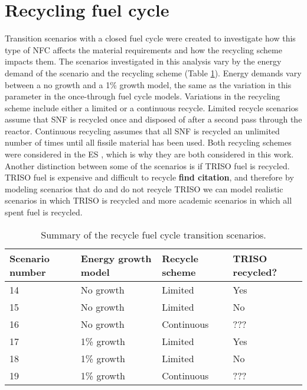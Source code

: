 \section{Recycling fuel cycle}
Transition scenarios with a closed fuel cycle were created
to investigate how this type of \gls{NFC} affects the material requirements 
and how the recycling scheme impacts them. 
The scenarios investigated in this analysis vary by the 
energy demand of the scenario and the recycling scheme (Table 
\ref{tab:scenarios_recycle}). Energy demands vary 
between a no growth and a 1\% growth model, the same as the variation in this 
parameter in the once-through fuel cycle models. Variations in the recycling 
scheme include either a limited or a continuous recycle. Limited recycle 
scenarios assume that \gls{SNF} is recycled once and disposed of after a 
second pass through the reactor. Continuous recycling assumes that all 
\gls{SNF} is recycled an unlimited number of times until all fissile 
material has been used. Both recycling schemes were considered in the 
\acrfull{ES} \cite{wigeland_nuclear_2014}, which is why they are both 
considered in this work. Another distinction between some of the 
scenarios is if \gls{TRISO} fuel is recycled. \gls{TRISO} fuel is 
expensive and difficult to recycle \textbf{find citation}, and 
therefore by modeling scenarios that do and do not recycle 
\gls{TRISO} we can model realistic scenarios in which \gls{TRISO} 
is recycled and more academic scenarios in which all spent fuel is 
recycled. 

\begin{table}[ht]
    \centering
    \caption{Summary of the recycle fuel cycle transition scenarios.}
    \label{tab:scenarios_recycle}
    \begin{tabular}{l l l l}
            \hline
            Scenario number & Energy growth model & Recycle scheme & TRISO recycled?\\
            \hline
            14 & No growth & Limited & Yes\\
            15 & No growth & Limited & No\\
            16 & No growth & Continuous & ??? \\
            17 & 1\% growth & Limited & Yes\\
            18 & 1\% growth & Limited & No\\
            19 & 1\% growth & Continuous & ??? \\
            \hline
    \end{tabular}
\end{table}

